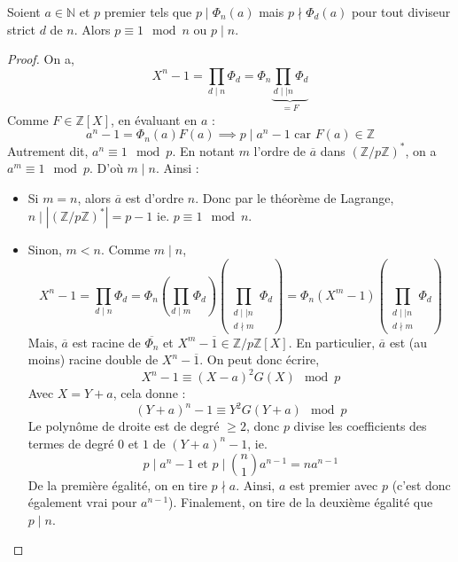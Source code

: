 





  \begin{lemma}
    \label{theoreme-de-dirichlet-faible-1}
    Soient $a \in \mathbb{N}$ et $p$ premier tels que $p \mid \Phi_n(a)$ mais $p \nmid \Phi_d(a)$ pour tout diviseur strict $d$ de $n$. Alors $p \equiv 1 \mod n$ ou $p \mid n$.
  \end{lemma}

  \begin{proof}
    On a,
    \[ X^n - 1 = \prod_{d \mid n} \Phi_d = \Phi_n \underbrace{\prod_{d \mid \mid n} \Phi_d}_{= F} \]
    Comme $F \in \mathbb{Z}[X]$, en évaluant en $a$ :
    \[ a^n - 1 = \Phi_n(a) F(a) \implies p \mid a^n - 1 \text{ car } F(a) \in \mathbb{Z} \]
    Autrement dit, $a^n \equiv 1 \mod p$. En notant $m$ l'ordre de $\overline{a}$ dans $(\mathbb{Z}/p\mathbb{Z})^*$, on a $a^m \equiv 1 \mod p$. D'où $m \mid n$. Ainsi :
    \begin{itemize}
      \item Si $m = n$, alors $\overline{a}$ est d'ordre $n$. Donc par le théorème de Lagrange, $n \mid |(\mathbb{Z}/p\mathbb{Z})^*| = p-1$ ie. $p \equiv 1 \mod n$.
      \item Sinon, $m < n$. Comme $m \mid n$,
      \[ X^n-1 = \prod_{d \mid n} \Phi_d = \Phi_n \left ( \prod_{d \mid m} \Phi_d \right ) \left ( \prod_{\substack{d \mid \mid n \\ d \nmid m}} \Phi_d \right ) = \Phi_n (X^m - 1) \left ( \prod_{\substack{d \mid \mid n \\ d \nmid m}} \Phi_d \right ) \]
      Mais, $\overline{a}$ est racine de $\overline{\Phi_n}$ et $X^m - \overline{1} \in \mathbb{Z}/p\mathbb{Z}[X]$. En particulier, $\overline{a}$ est (au moins) racine double de $X^n - \overline{1}$. On peut donc écrire,
      \[ X^n - 1 \equiv (X-a)^2 G(X) \mod p \]
      Avec $X = Y+a$, cela donne :
      \[ (Y+a)^n - 1 \equiv Y^2 G(Y+a) \mod p \]
      Le polynôme de droite est de degré $\geq 2$, donc $p$ divise les coefficients des termes de degré $0$ et $1$ de $(Y+a)^n-1$, ie.
      \[ p \mid a^n - 1 \text{ et } p \mid \binom{n}{1} a^{n-1} = n a^{n-1} \]
      De la première égalité, on en tire $p \nmid a$. Ainsi, $a$ est premier avec $p$ (c'est donc également vrai pour $a^{n-1}$). Finalement, on tire de la deuxième égalité que $p \mid n$.
    \end{itemize}
  \end{proof}

